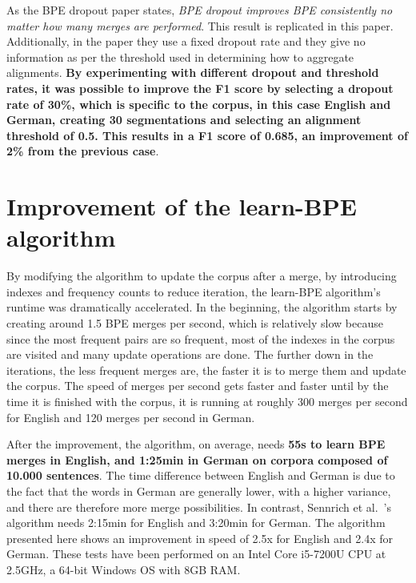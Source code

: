 As the BPE dropout paper states, \emph{BPE dropout improves BPE consistently no matter how many merges are performed}. This result is replicated in this paper. Additionally, in the paper they use a fixed dropout rate and they give no information as per the threshold used in determining how to aggregate alignments. \textbf{By experimenting with different dropout and threshold rates, it was possible to improve the F1 score by selecting a dropout rate of 30\%, which is specific to the corpus, in this case English and German, creating 30 segmentations and selecting an alignment threshold of 0.5. This results in a F1 score of 0.685, an improvement of 2\% from the previous case}.

\section{Improvement of the learn-BPE algorithm}

By modifying the algorithm to update the corpus after a merge, by introducing indexes and frequency counts to reduce iteration, the learn-BPE algorithm's runtime was dramatically accelerated. In the beginning, the algorithm starts by creating around 1.5 BPE merges per second, which is relatively slow because since the most frequent pairs are so frequent, most of the indexes in the corpus are visited and many update operations are done. The further down in the iterations, the less frequent merges are, the faster it is to merge them and update the corpus. The speed of merges per second gets faster and faster until by the time it is finished with the corpus, it is running at roughly 300 merges per second for English and 120 merges per second in German.

After the improvement, the algorithm, on average, needs \textbf{55s to learn BPE merges in English, and 1:25min in German on corpora composed of 10.000 sentences}. The time difference between English and German is due to the fact that the words in German are generally lower, with a higher variance, and there are therefore more merge possibilities. In contrast, Sennrich et al.~\cite{sennrich2015neural}'s algorithm needs 2:15min for English and 3:20min for German. The algorithm presented here shows an improvement in speed of 2.5x for English and 2.4x for German. These tests have been performed on an Intel Core i5-7200U CPU at 2.5GHz, a 64-bit Windows OS with 8GB RAM.

